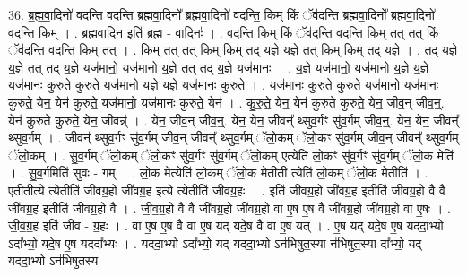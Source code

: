 \documentclass[17pt]{extarticle}
\begin{document}
36. ब्र॒ह्म॒वा॒दिनो॑ वदन्ति वदन्ति ब्रह्मवा॒दिनो᳚ ब्रह्मवा॒दिनो॑ वदन्ति॒ किम् किं ॅव॑दन्ति ब्रह्मवा॒दिनो᳚ ब्रह्मवा॒दिनो॑ वदन्ति॒ किम् । . ब्र॒ह्म॒वा॒दिन॒ इति॑ ब्रह्म - वा॒दिनः॑ । . व॒द॒न्ति॒ किम् किं ॅव॑दन्ति वदन्ति॒ किम् तत् तत् किं ॅव॑दन्ति वदन्ति॒ किम् तत् । . किम् तत् तत् किम् किम् तद् य॒ज्ञे य॒ज्ञे तत् किम् किम् तद् य॒ज्ञे । . तद् य॒ज्ञे य॒ज्ञे तत् तद् य॒ज्ञे यज॑मानो॒ यज॑मानो य॒ज्ञे तत् तद् य॒ज्ञे यज॑मानः । . य॒ज्ञे यज॑मानो॒ यज॑मानो य॒ज्ञे य॒ज्ञे यज॑मानः कुरुते कुरुते॒ यज॑मानो य॒ज्ञे य॒ज्ञे यज॑मानः कुरुते । . यज॑मानः कुरुते कुरुते॒ यज॑मानो॒ यज॑मानः कुरुते॒ येन॒ येन॑ कुरुते॒ यज॑मानो॒ यज॑मानः कुरुते॒ येन॑ । . कु॒रु॒ते॒ येन॒ येन॑ कुरुते कुरुते॒ येन॒ जीव॒न् जीव॒न्॒. येन॑ कुरुते कुरुते॒ येन॒ जीवन्न्॑ । . येन॒ जीव॒न् जीव॒न्॒. येन॒ येन॒ जीवन्᳚ थ्सुव॒र्गꣳ सु॑व॒र्गम् जीव॒न्॒. येन॒ येन॒ जीवन्᳚ थ्सुव॒र्गम् । . जीवन्᳚ थ्सुव॒र्गꣳ सु॑व॒र्गम् जीव॒न् जीवन्᳚ थ्सुव॒र्गम् ॅलो॒कम् ॅलो॒कꣳ सु॑व॒र्गम् जीव॒न् जीवन्᳚ थ्सुव॒र्गम् ॅलो॒कम् । . सु॒व॒र्गम् ॅलो॒कम् ॅलो॒कꣳ सु॑व॒र्गꣳ सु॑व॒र्गम् ॅलो॒कम् एत्येति॑ लो॒कꣳ सु॑व॒र्गꣳ 
सु॑व॒र्गम् ॅलो॒क मेति॑ । . सु॒व॒र्गमिति॑ सुवः - गम् । . लो॒क मेत्येति॑ लो॒कम् ॅलो॒क मेतीती त्येति॑ लो॒कम् ॅलो॒क मेतीति॑ । . एतीतीत्ये त्येतीति॑ जीवग्र॒हो जी॑वग्र॒ह इत्ये त्येतीति॑ जीवग्र॒हः । . इति॑ जीवग्र॒हो जी॑वग्र॒ह इतीति॑ जीवग्र॒हो वै वै जी॑वग्र॒ह इतीति॑ जीवग्र॒हो वै । . जी॒व॒ग्र॒हो वै वै जी॑वग्र॒हो जी॑वग्र॒हो वा ए॒ष ए॒ष वै जी॑वग्र॒हो जी॑वग्र॒हो वा ए॒षः । . जी॒व॒ग्र॒ह इति॑ जीव - ग्र॒हः । . वा ए॒ष ए॒ष वै वा ए॒ष यद् यदे॒ष वै वा ए॒ष यत् । . ए॒ष यद् यदे॒ष ए॒ष यददा॒भ्यो ऽदा᳚भ्यो॒ यदे॒ष ए॒ष यददा᳚भ्यः । . यददा॒भ्यो ऽदा᳚भ्यो॒ यद् यददा॒भ्यो ऽन॑भिषुत॒स्या न॑भिषुत॒स्या दा᳚भ्यो॒ यद् यददा॒भ्यो ऽन॑भिषुतस्य । \newline
\end{document}
